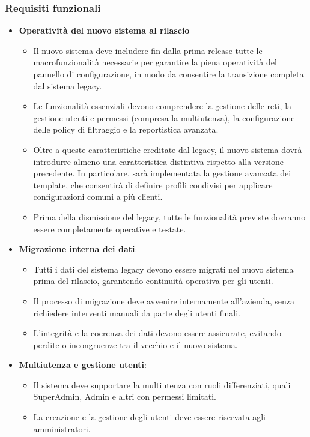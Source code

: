 \subsubsection{Requisiti funzionali}
\begin{itemize}
  \item \textbf{Operatività del nuovo sistema al rilascio}
    \begin{itemize}
      \item Il nuovo sistema deve includere fin dalla prima release tutte le macrofunzionalità necessarie per garantire la piena operatività del pannello di configurazione, in modo da consentire la transizione completa dal sistema legacy.
      \item Le funzionalità essenziali devono comprendere la gestione delle reti, la gestione utenti e permessi (compresa la multiutenza), la configurazione delle policy di filtraggio e la reportistica avanzata.
      \item Oltre a queste caratteristiche ereditate dal legacy, il nuovo sistema dovrà introdurre almeno una caratteristica distintiva rispetto alla versione precedente. In particolare, sarà implementata la gestione avanzata dei template, che consentirà di definire profili condivisi per applicare configurazioni comuni a più clienti.
      \item Prima della dismissione del legacy, tutte le funzionalità previste dovranno essere completamente operative e testate.
    \end{itemize}

  \item \textbf{Migrazione interna dei dati}:
    \begin{itemize}
      \item Tutti i dati del sistema legacy devono essere migrati nel nuovo sistema prima del rilascio, garantendo continuità operativa per gli utenti.
      \item Il processo di migrazione deve avvenire internamente all’azienda, senza richiedere interventi manuali da parte degli utenti finali.
      \item L’integrità e la coerenza dei dati devono essere assicurate, evitando perdite o incongruenze tra il vecchio e il nuovo sistema.
    \end{itemize}

  \item \textbf{Multiutenza e gestione utenti}:
    \begin{itemize}
      \item Il sistema deve supportare la multiutenza con ruoli differenziati, quali SuperAdmin, Admin e altri con permessi limitati.
      \item La creazione e la gestione degli utenti deve essere riservata agli amministratori.
    \end{itemize}


\end{itemize}
